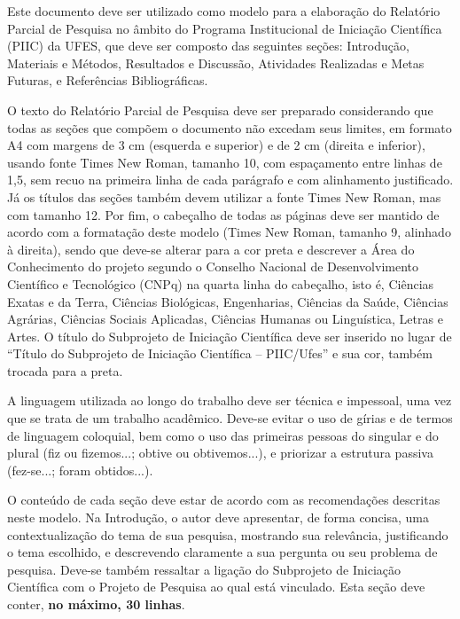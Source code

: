 \documentclass[10pt, a4paper]{article}
\begin{document}
Este documento deve ser utilizado como modelo para a elaboração do Relatório Parcial de Pesquisa no âmbito do Programa Institucional de Iniciação Científica (PIIC) da UFES, que deve ser composto das seguintes seções: Introdução, Materiais e Métodos, Resultados e Discussão, Atividades Realizadas e Metas Futuras, e Referências Bibliográficas. 

O texto do Relatório Parcial de Pesquisa deve ser preparado considerando que todas as seções que compõem o documento não excedam seus limites, em formato A4 com margens de 3 cm (esquerda e superior) e de 2 cm (direita e inferior), usando fonte Times New Roman, tamanho 10, com espaçamento entre linhas de 1,5, sem recuo na primeira linha de cada parágrafo e com alinhamento justificado. Já os títulos das seções também devem utilizar a fonte Times New Roman, mas com tamanho 12. Por fim, o cabeçalho de todas as páginas deve ser mantido de acordo com a formatação deste modelo (Times New Roman, tamanho 9, alinhado à direita), sendo que deve-se alterar para a cor preta e descrever a Área do Conhecimento do projeto segundo o Conselho Nacional de Desenvolvimento Científico e Tecnológico (CNPq) na quarta linha do cabeçalho, isto é, Ciências Exatas e da Terra, Ciências Biológicas, Engenharias, Ciências da Saúde, Ciências Agrárias, Ciências Sociais Aplicadas, Ciências Humanas ou Linguística, Letras e Artes. O título do Subprojeto de Iniciação Científica deve ser inserido no lugar de ``Título do Subprojeto de Iniciação Científica – PIIC/Ufes'' e sua cor, também trocada para a preta.

A linguagem utilizada ao longo do trabalho deve ser técnica e impessoal, uma vez que se trata de um trabalho acadêmico. Deve-se evitar o uso de gírias e de termos de linguagem coloquial, bem como o uso das primeiras pessoas do singular e do plural (fiz ou fizemos...; obtive ou obtivemos...), e priorizar a estrutura passiva (fez-se...; foram obtidos...). 

O conteúdo de cada seção deve estar de acordo com as recomendações descritas neste modelo. Na Introdução, o autor deve apresentar, de forma concisa, uma contextualização do tema de sua pesquisa, mostrando sua relevância, justificando o tema escolhido, e descrevendo claramente a sua pergunta ou seu problema de pesquisa. Deve-se também ressaltar a ligação do Subprojeto de Iniciação Científica com o Projeto de Pesquisa ao qual está vinculado. Esta seção deve conter, \textbf{no máximo, 30 linhas}.



\end{document}
